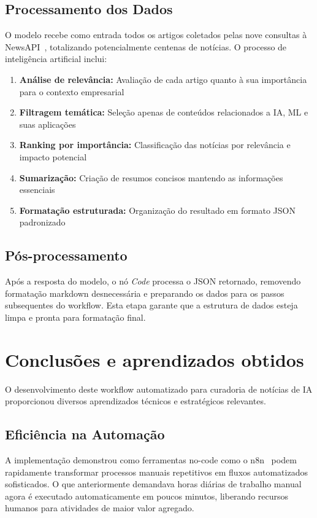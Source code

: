 \documentclass{sftex}
\begin{document}
\subsection{Processamento dos Dados}
O modelo recebe como entrada todos os artigos coletados pelas nove consultas à NewsAPI~\cite{newsapi}, totalizando potencialmente centenas de notícias. O processo de inteligência artificial inclui:

\begin{enumerate}
    \item \textbf{Análise de relevância:} Avaliação de cada artigo quanto à sua importância para o contexto empresarial
    \item \textbf{Filtragem temática:} Seleção apenas de conteúdos relacionados a IA, ML e suas aplicações
    \item \textbf{Ranking por importância:} Classificação das notícias por relevância e impacto potencial
    \item \textbf{Sumarização:} Criação de resumos concisos mantendo as informações essenciais
    \item \textbf{Formatação estruturada:} Organização do resultado em formato JSON padronizado
\end{enumerate}

\subsection{Pós-processamento}
Após a resposta do modelo, o nó \textit{Code} processa o JSON retornado, removendo formatação markdown desnecessária e preparando os dados para os passos subsequentes do workflow. Esta etapa garante que a estrutura de dados esteja limpa e pronta para formatação final.

\section{Conclusões e aprendizados obtidos}

O desenvolvimento deste workflow automatizado para curadoria de notícias de IA proporcionou diversos aprendizados técnicos e estratégicos relevantes.

\subsection{Eficiência na Automação}
A implementação demonstrou como ferramentas no-code como o n8n~\cite{n8n_platform} podem rapidamente transformar processos manuais repetitivos em fluxos automatizados sofisticados. O que anteriormente demandava horas diárias de trabalho manual agora é executado automaticamente em poucos minutos, liberando recursos humanos para atividades de maior valor agregado.
\end{document}
